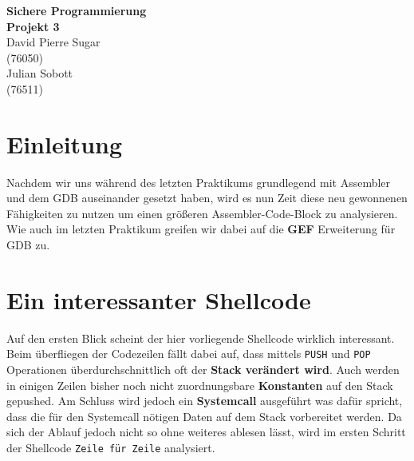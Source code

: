 \documentclass[12pt]{article}
\begin{document}
\begin{center}
  \textbf{\LARGE Sichere Programmierung} \\[1ex]%
  \textbf{\Large Projekt 3}\\[2ex] %
  David Pierre Sugar\\ %
  (76050) \\ %
  Julian Sobott\\ %
  (76511) \\ %
  
\end{center}

\tableofcontents

\section{Einleitung}
Nachdem wir uns während des letzten Praktikums grundlegend mit Assembler und dem GDB auseinander gesetzt haben, wird es nun Zeit diese neu gewonnenen Fähigkeiten zu nutzen um einen größeren Assembler-Code-Block zu analysieren.
\newline
\newline
Wie auch im letzten Praktikum greifen wir dabei auf die \textbf{GEF} Erweiterung für GDB zu.

\section{Ein interessanter Shellcode}
Auf den ersten Blick scheint der hier vorliegende Shellcode wirklich interessant. Beim überfliegen der Codezeilen fällt dabei auf, dass mittels \texttt{PUSH} und \texttt{POP} Operationen überdurchschnittlich oft der \textbf{Stack verändert wird}. Auch werden in einigen Zeilen bisher noch nicht zuordnungsbare \textbf{Konstanten} auf den Stack gepushed. Am Schluss wird jedoch ein \textbf{Systemcall} ausgeführt was dafür spricht, dass die für den Systemcall nötigen Daten auf dem Stack vorbereitet werden.
\newline
\newline
Da sich der Ablauf jedoch nicht so ohne weiteres ablesen lässt, wird im ersten Schritt der Shellcode \texttt{Zeile für Zeile} analysiert.

\end{document}
